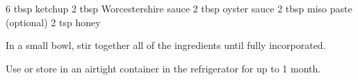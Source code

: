 \dishtype{\sauce}
\dishother{\vegetarian}
\begin{ingreds}
    6 tbsp ketchup
    2 tbsp Worcestershire sauce
    2 tbsp oyster sauce
    2 tbsp miso paste (optional)
    2 tsp honey
\end{ingreds}
\begin{method}
    In a small bowl, stir together all of the ingredients until fully incorporated.\par
    Use or store in an airtight container in the refrigerator for up to 1 month.
\end{method}